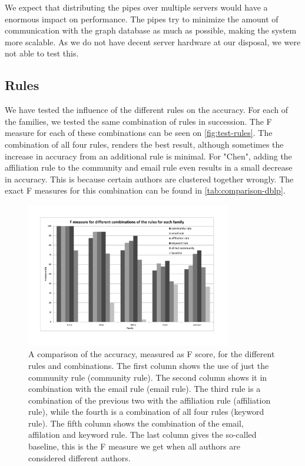 We expect that distributing the pipes over multiple servers would have a enormous impact on performance. The pipes try to minimize the amount of communication with the graph database as much as possible, making the system more scalable. As we do not have decent server hardware at our disposal, we were not able to test this.

\subsection{Rules}

We have tested the influence of the different rules on the accuracy. For each of the families, we tested the same combination of rules in succession. The F measure for each of these combinations can be seen on \autoref{fig:test-rules}. The combination of all four rules, renders the best result, although sometimes the increase in accuracy from an additional rule is minimal. For "Chen", adding the affiliation rule to the community and email rule even results in a small decrease in accuracy. This is because certain authors are clustered together wrongly. The exact F measures for this combination can be found in \autoref{tab:comparison-dblp}. 

\begin{figure}[htb]
	\centering
		\includegraphics[width=0.80\textwidth]{./fig/test-rules.pdf}
	\caption{A comparison of the accuracy, measured as F score, for the different rules and combinations. The first column shows the use of just the community rule (community rule). The second column shows it in combination with the email rule (email rule). The third rule is a combination of the previous two with the affiliation rule (affiliation rule), while the fourth is a combination of all four rules (keyword rule). The fifth column shows the combination of the email, affilation and keyword rule. The last column gives the so-called baseline, this is the F measure we get when all authors are considered different authors.}
	\label{fig:test-rules}
\end{figure}

